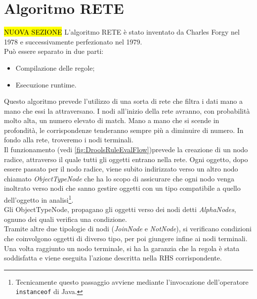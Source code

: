 \section{Algoritmo RETE}
\hl{NUOVA SEZIONE}
 \label{App:AppendiceAlgoritmoRete}
 	L'algoritmo RETE è stato inventato da Charles Forgy nel 1978 e successivamente perfezionato nel 1979. \\
 	Può essere separato in due parti:
 	\begin{itemize}
 		\item Compilazione delle regole;
 		\item Esecuzione runtime.
 	\end{itemize}
 	Questo algoritmo prevede l'utilizzo di una sorta di rete che filtra i dati mano a mano che essi la attraversano. I nodi all'inizio della rete avranno, con probabilità molto alta, un numero elevato di match. 
 	Mano a mano che si scende in profondità, le corrispondenze tenderanno sempre più a diminuire di numero. In fondo alla rete, troveremo i nodi terminali. \\
 	Il funzionamento (vedi  \autoref{fig:DroolsRuleEvalFlow})prevede la creazione di un nodo radice, attraverso il quale tutti gli oggetti entrano nella rete. Ogni oggetto, dopo essere passato per il nodo radice, viene subito indirizzato verso un altro nodo chiamato \textit{ObjectTypeNode} che ha lo scopo di assicurare che ogni nodo venga inoltrato verso nodi che sanno gestire oggetti con un tipo compatibile a quello dell'oggetto in analisi\footnote{Tecnicamente questo passaggio avviene mediante l'invocazione dell'operatore \texttt{instanceof} di Java.}.\\
 	Gli ObjectTypeNode,  propagano gli oggetti verso dei nodi detti \textit{AlphaNodes}, ognuno dei quali verifica una condizione. \\
 	Tramite altre due tipologie di nodi (\textit{JoinNode} e \textit{NotNode}), si verificano condizioni che coinvolgono oggetti di diverso tipo, per poi giungere infine ai nodi terminali. \\
 	Una volta raggiunto un nodo terminale, si ha la garanzia che la regola è stata soddisfatta e viene eseguita l'azione descritta nella RHS corrispondente.
 	
